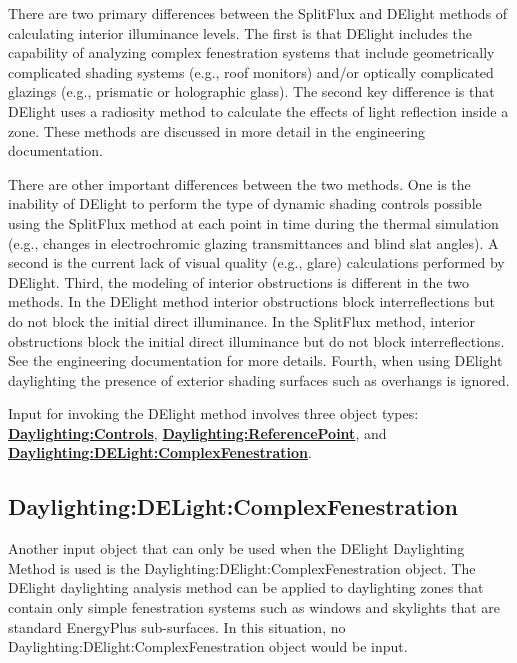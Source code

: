 There are two primary differences between the SplitFlux and DElight methods of calculating interior illuminance levels. The first is that DElight includes the capability of analyzing complex fenestration systems that include geometrically complicated shading systems (e.g., roof monitors) and/or optically complicated glazings (e.g., prismatic or holographic glass). The second key difference is that DElight uses a radiosity method to calculate the effects of light reflection inside a zone. These methods are discussed in more detail in the engineering documentation.

There are other important differences between the two methods. One is the inability of DElight to perform the type of dynamic shading controls possible using the SplitFlux method at each point in time during the thermal simulation (e.g., changes in electrochromic glazing transmittances and blind slat angles).  A second is the current lack of visual quality (e.g., glare) calculations performed by DElight. Third, the modeling of interior obstructions is different in the two methods. In the DElight method interior obstructions block interreflections but do not block the initial direct illuminance. In the SplitFlux method, interior obstructions block the initial direct illuminance but do not block interreflections. See the engineering documentation for more details. Fourth, when using DElight daylighting the presence of exterior shading surfaces such as overhangs is ignored.

Input for invoking the DElight method involves three object types: \textbf{\hyperref[daylightingcontrols-000]{Daylighting:Controls}}, \textbf{\hyperref[daylightingreferencepoint-000]{Daylighting:ReferencePoint}}, and \textbf{\hyperref[daylightingdelightcomplexfenestration]{Daylighting:DELight:ComplexFenestration}}.


\subsection{Daylighting:DELight:ComplexFenestration}\label{daylightingdelightcomplexfenestration}

Another input object that can only be used when the DElight Daylighting Method is used is  the Daylighting:DElight:ComplexFenestration object. The DElight daylighting analysis method can be applied to daylighting zones that contain only simple fenestration systems such as windows and skylights that are standard EnergyPlus sub-surfaces. In this situation, no Daylighting:DElight:ComplexFenestration object would be input.

